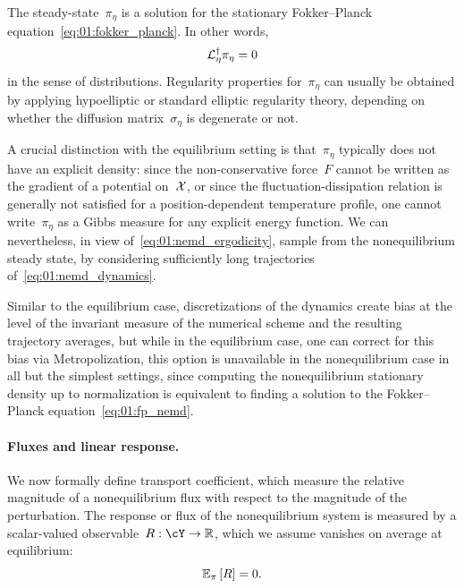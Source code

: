 The steady-state~$\pi_\eta$ is a solution for the stationary Fokker--Planck equation~\eqref{eq:01:fokker_planck}. In other words,
\begin{equation}
    \label{eq:01:fp_nemd}
    \mathcal{L}_\eta^\dagger \pi_\eta = 0
\end{equation}
in the sense of distributions.
Regularity properties for~$\pi_\eta$ can usually be obtained by applying hypoelliptic or standard elliptic regularity theory, depending on whether the diffusion matrix~$\sigma_\eta$ is degenerate or not.

A crucial distinction with the equilibrium setting is that~$\pi_\eta$ typically does not have an explicit density: since the non-conservative force~$F$ cannot be written as the gradient of a potential on~$\mathcal{X}$, or since the fluctuation-dissipation relation is generally not satisfied for a position-dependent temperature profile, one cannot write~$\pi_\eta$ as a Gibbs measure for any explicit energy function. We can nevertheless, in view of~\eqref{eq:01:nemd_ergodicity}, sample from the nonequilibrium steady state, by considering sufficiently long trajectories of~\eqref{eq:01:nemd_dynamics}.

Similar to the equilibrium case, discretizations of the dynamics create bias at the level of the invariant measure of the numerical scheme and the resulting trajectory averages, but while in the equilibrium case, one can correct for this bias via Metropolization, this option is unavailable in the nonequilibrium case in all but the simplest settings, since computing the nonequilibrium stationary density up to normalization is equivalent to finding a solution to the Fokker--Planck equation~\eqref{eq:01:fp_nemd}.

\paragraph{Fluxes and linear response.}
We now formally define transport coefficient, which measure the relative magnitude of a nonequilibrium flux with respect to the magnitude of the perturbation.
The response or flux of the nonequilibrium system is measured by a scalar-valued observable~$R:\cY\to\R$, which we assume vanishes on average at equilibrium:
\begin{equation}
    \label{eq:01:response_function}
    \mathbb{E}_{\pi}\left[R\right]=0.
\end{equation}

